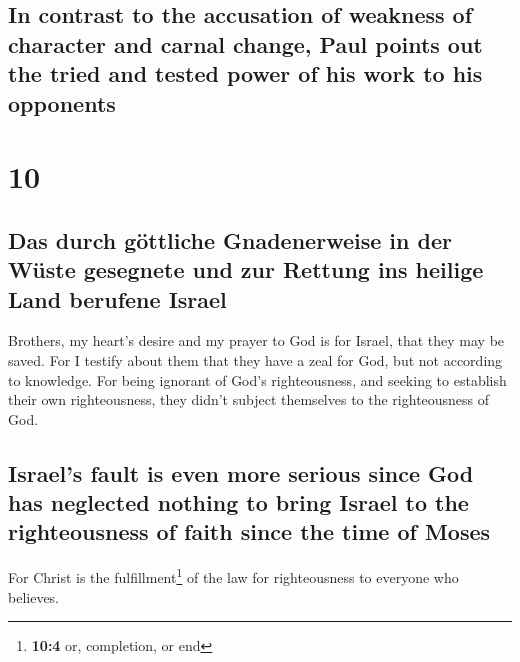 \begin{paracol}{2}
\begin{otherlanguage}{english}
\hypertarget{in-contrast-to-the-accusation-of-weakness-of-character-and-carnal-change-paul-points-out-the-tried-and-tested-power-of-his-work-to-his-opponents}{%
\subsection{In contrast to the accusation of weakness of character and
carnal change, Paul points out the tried and tested power of his work to
his
opponents}\label{in-contrast-to-the-accusation-of-weakness-of-character-and-carnal-change-paul-points-out-the-tried-and-tested-power-of-his-work-to-his-opponents}}

\hypertarget{section-19}{%
\section{10}\label{section-19}}

\hypertarget{das-durch-guxf6ttliche-gnadenerweise-in-der-wuxfcste-gesegnete-und-zur-rettung-ins-heilige-land-berufene-israel}{%
\subsection{Das durch göttliche Gnadenerweise in der Wüste gesegnete und
zur Rettung ins heilige Land berufene
Israel}\label{das-durch-guxf6ttliche-gnadenerweise-in-der-wuxfcste-gesegnete-und-zur-rettung-ins-heilige-land-berufene-israel}}

 Brothers, my heart's desire and my prayer to God is for
Israel, that they may be saved.  For I testify about them
that they have a zeal for God, but not according to knowledge.
 For being ignorant of God's righteousness, and seeking to
establish their own righteousness, they didn't subject themselves to the
righteousness of God.

\hypertarget{israels-fault-is-even-more-serious-since-god-has-neglected-nothing-to-bring-israel-to-the-righteousness-of-faith-since-the-time-of-moses}{%
\subsection{Israel's fault is even more serious since God has neglected
nothing to bring Israel to the righteousness of faith since the time of
Moses}\label{israels-fault-is-even-more-serious-since-god-has-neglected-nothing-to-bring-israel-to-the-righteousness-of-faith-since-the-time-of-moses}}

 For Christ is the fulfillment\footnote{\textbf{10:4} or,
  completion, or end} of the law for righteousness to everyone who
believes.


\end{otherlanguage}
\end{paracol}
